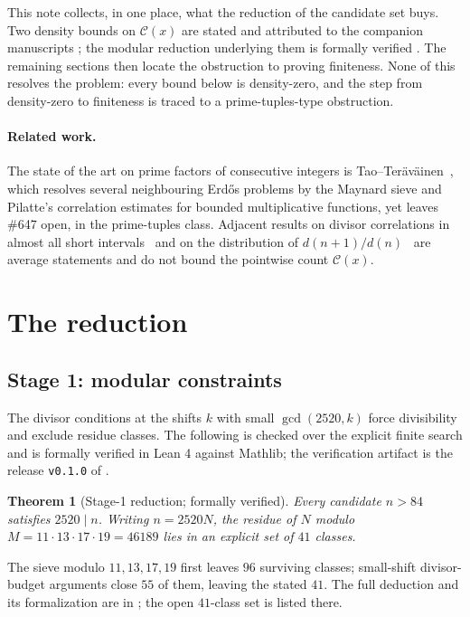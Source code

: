 \documentclass[11pt]{article}
\newtheorem{theorem}{Theorem}[section]
\theoremstyle{remark}
\newcommand{\C}{\mathcal{C}}
\begin{document}
This note collects, in one place, what the reduction of the candidate set buys. Two
density bounds on $\C(x)$ are stated and attributed to the companion manuscripts
\cite{HughesChains,HughesWindow}; the modular reduction underlying them is formally
verified \cite{ProofChain}. The remaining sections then locate the obstruction to
proving finiteness. None of this resolves the problem: every bound below is
density-zero, and the step from density-zero to finiteness is traced to a
prime-tuples-type obstruction.

\paragraph{Related work.} The state of the art on prime factors of consecutive integers is
Tao--Ter\"av\"ainen~\cite{TaoTeravainen2025}, which resolves several neighbouring Erd\H{o}s
problems by the Maynard sieve and Pilatte's correlation estimates for bounded multiplicative
functions, yet leaves \#647 open, in the prime-tuples class. Adjacent results on divisor
correlations in almost all short intervals~\cite{PliegoSunWang} and on the distribution of
$d(n+1)/d(n)$~\cite{SchlagePuchta} are average statements and do not bound the pointwise count
$\C(x)$.

\section{The reduction}

\subsection*{Stage 1: modular constraints}

The divisor conditions at the shifts $k$ with small $\gcd(2520,k)$ force divisibility
and exclude residue classes. The following is checked over the explicit finite search
and is formally verified in Lean 4 against Mathlib; the verification artifact is the
release \texttt{v0.1.0} of \cite{ProofChain}.

\begin{theorem}[Stage-1 reduction; formally verified]\label{thm:stage1}
Every candidate $n>84$ satisfies $2520\mid n$. Writing $n=2520N$, the residue of $N$
modulo $M=11\cdot13\cdot17\cdot19=46189$ lies in an explicit set of $41$ classes.
\end{theorem}

The sieve modulo $11,13,17,19$ first leaves $96$ surviving classes; small-shift
divisor-budget arguments close $55$ of them, leaving the stated $41$. The full
deduction and its formalization are in \cite{ProofChain}; the open $41$-class set is
listed there.
\end{document}
